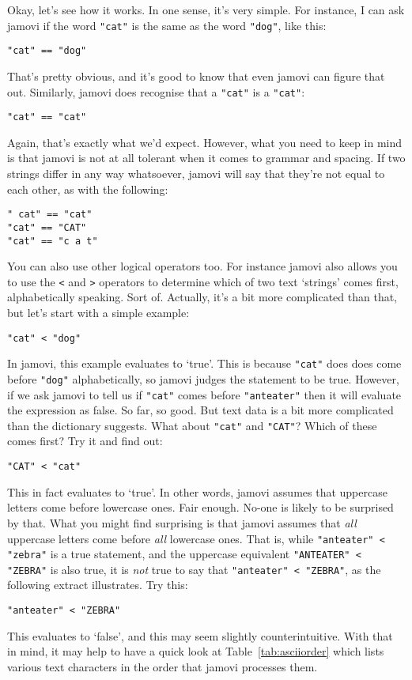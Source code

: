 Okay, let's see how it works. In one sense, it's very simple. For instance, I can ask jamovi if the word \texttt{"cat"} is the same as the word \texttt{"dog"}, like this:
\begin{verbatim}
"cat" == "dog"
\end{verbatim}
That's pretty obvious, and it's good to know that even jamovi can figure that out. Similarly, jamovi does recognise that a \texttt{"cat"} is a \texttt{"cat"}:
\begin{verbatim}
"cat" == "cat"
\end{verbatim}
Again, that's exactly what we'd expect. However, what you need to keep in mind is that jamovi is not at all tolerant when it comes to grammar and spacing. If two strings differ in any way whatsoever, jamovi will say that they're not equal to each other, as with the following: 
\begin{verbatim}
" cat" == "cat"
"cat" == "CAT"
"cat" == "c a t"
\end{verbatim}
You can also use other logical operators too. For instance jamovi also allows you to use the \texttt{<} and \texttt{>} operators to determine which of two text `strings' comes first, alphabetically speaking. Sort of. Actually, it's a bit more complicated than that, but let's start with a simple example:
\begin{verbatim}
"cat" < "dog"
\end{verbatim}
In jamovi, this example evaluates to `true'. This is because \texttt{"cat"} does does come before \texttt{"dog"} alphabetically, so jamovi judges the statement to be true. However, if we ask jamovi to tell us if \texttt{"cat"} comes before \texttt{"anteater"} then it will evaluate the expression as false. So far, so good. But text data is a bit more complicated than the dictionary suggests. What about \texttt{"cat"} and \texttt{"CAT"}? Which of these comes first? Try it and find out:
\begin{verbatim}
"CAT" < "cat"
\end{verbatim}
This in fact evaluates to `true'. In other words, jamovi assumes that uppercase letters come before lowercase ones. Fair enough. No-one is likely to be surprised by that. What you might find surprising is that jamovi assumes that {\it all} uppercase letters come before {\it all} lowercase ones. That is, while \texttt{"anteater" < "zebra"} is a true statement, and the uppercase equivalent \texttt{"ANTEATER" < "ZEBRA"} is also true, it is {\it not} true to say that \texttt{"anteater" < "ZEBRA"}, as the following extract illustrates. Try this: 
\begin{verbatim}
"anteater" < "ZEBRA"
\end{verbatim}
This evaluates to `false', and this may seem slightly counterintuitive. With that in mind, it may help to have a quick look at Table~\ref{tab:asciiorder} which lists various text characters in the order that jamovi processes them. 

